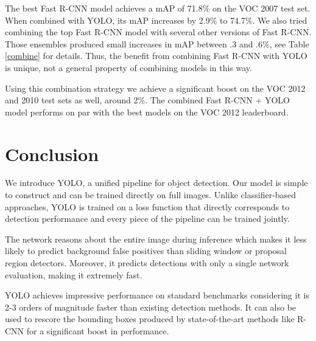 \documentclass{article} %
\begin{document}
The best Fast R-CNN model achieves a mAP of 71.8\% on the VOC 2007 test set. When combined with YOLO, its mAP increases by 2.9\% to 74.7\%. We also tried combining the top Fast R-CNN model with several other versions of Fast R-CNN. Those ensembles produced small increases in mAP between .3 and .6\%, see Table \ref{combine} for details. Thus, the benefit from combining Fast R-CNN with YOLO is unique, not a general property of combining models in this way.

Using this combination strategy we achieve a significant boost on the VOC 2012 and 2010 test sets as well, around 2\%. The combined Fast R-CNN + YOLO model performs on par with the best models on the VOC 2012 leaderboard.

\section{Conclusion}

We introduce YOLO, a unified pipeline for object detection. Our model is simple to construct and can be trained directly on full images. Unlike classifier-based approaches, YOLO is trained on a loss function that directly corresponds to detection performance and every piece of the pipeline can be trained jointly.

The network reasons about the entire image during inference which makes it less likely to predict background false positives than sliding window or proposal region detectors. Moreover, it predicts detections with only a single network evaluation, making it extremely fast.

YOLO achieves impressive performance on standard benchmarks considering it is 2-3 orders of magnitude faster than existing detection methods. It can also be used to rescore the bounding boxes produced by state-of-the-art methods like R-CNN for a significant boost in performance.





{\small


}
\end{document}
